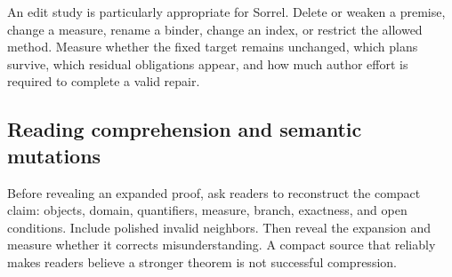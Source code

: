 \documentclass[11pt,a4paper]{article}
\numberwithin{equation}{section}
\theoremstyle{definition}\newtheorem{definition}[theorem]{Definition}
\theoremstyle{remark}\newtheorem{remark}[theorem]{Remark}
\begin{document}
An edit study is particularly appropriate for Sorrel. Delete or weaken a
premise, change a measure, rename a binder, change an index, or restrict the
allowed method. Measure whether the fixed target remains unchanged, which
plans survive, which residual obligations appear, and how much author effort
is required to complete a valid repair.

\subsection{Reading comprehension and semantic mutations}
Before revealing an expanded proof, ask readers to reconstruct the compact
claim: objects, domain, quantifiers, measure, branch, exactness, and open
conditions. Include polished invalid neighbors. Then reveal the expansion
and measure whether it corrects misunderstanding. A compact source that
reliably makes readers believe a stronger theorem is not successful compression.
\end{document}
